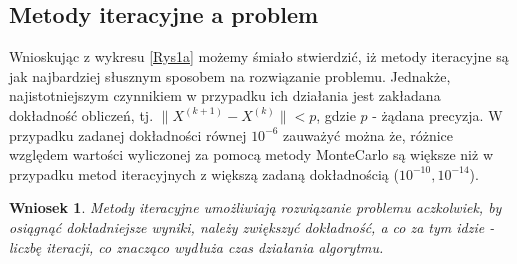 \documentclass[10pt]{article}
\newtheorem{wn}{Wniosek}
\begin{document}
\subsection{Metody iteracyjne a problem}
Wnioskując z wykresu \ref{Rys1a} możemy śmiało stwierdzić, iż metody iteracyjne są jak najbardziej słusznym sposobem na rozwiązanie problemu. Jednakże, najistotniejszym czynnikiem w przypadku ich działania jest zakładana dokładność obliczeń, tj. $\|{X^{(k+1)}-X^{(k)}}\| < p$, gdzie $p$ - żądana precyzja.
W przypadku zadanej dokładności równej $10^{-6}$ zauważyć można że, różnice względem wartości wyliczonej za pomocą metody MonteCarlo są większe niż w przypadku metod iteracyjnych z większą zadaną dokładnością ($10^{-10}, 10^{-14}$).
\begin{wn}
	Metody iteracyjne umożliwiają rozwiązanie problemu aczkolwiek, by osiągnąć dokładniejsze wyniki, należy zwiększyć dokładność, a co za tym idzie - liczbę iteracji, co znacząco wydłuża czas działania algorytmu. \label{wn:1}
\end{wn}
\end{document}

